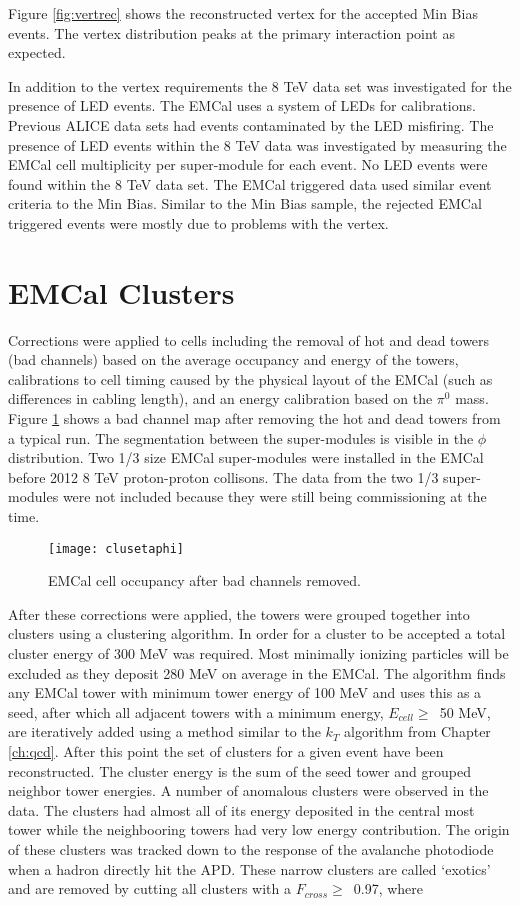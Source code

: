 Figure \ref{fig:vertrec} shows the reconstructed vertex for the accepted Min Bias events.  The vertex distribution peaks at the primary interaction point as expected. 

 In addition to the vertex requirements the 8 TeV data set was investigated for the presence of LED events.  The EMCal uses a system of LEDs for calibrations.  Previous ALICE data sets had events contaminated by the LED misfiring.  The presence of LED events within the 8 TeV data was investigated by measuring the EMCal cell multiplicity per super-module for each event.  No LED events were found within the 8 TeV data set.  The EMCal triggered data used similar event criteria to the Min Bias.  Similar to the Min Bias sample, the rejected EMCal triggered events were mostly due to problems with the vertex.


\section{EMCal Clusters}


Corrections were applied to cells including the removal of hot and dead towers (bad channels) based on the average occupancy and energy of the towers, calibrations to cell timing caused by the physical layout of the EMCal (such as differences in cabling length), and an energy calibration based on the $\pi^{0}$ mass.   Figure \ref{fig:badchannel} shows a bad channel map after removing the hot and dead towers from a typical run.  The segmentation between the super-modules is visible in the $\phi$ distribution.   Two 1/3 size EMCal super-modules were installed in the EMCal before 2012 8 TeV proton-proton collisons.  The data from the two 1/3 super-modules were not included because they were still being commissioning at the time.

\begin{figure}[h]
\texttt{[image: clusetaphi]}
\centering
\caption{EMCal cell occupancy after bad channels removed.}
\label{fig:badchannel}
\end{figure}

After these corrections were applied, the towers were grouped together into clusters using a clustering algorithm.  In order for a cluster to be accepted a total cluster energy of 300 MeV was required.  Most minimally ionizing particles will be excluded as they deposit 280 MeV on average in the EMCal.  The algorithm finds any EMCal tower with minimum tower energy of 100 MeV and uses this as a seed, after which all adjacent towers with a minimum energy, $E_{cell} \geq \,$ 50 MeV, are iteratively added using a method similar to the $k_{T}$ algorithm from Chapter \ref{ch:qcd}.  After this point the set of clusters for a given event have been reconstructed.  The cluster energy is the sum of the seed tower and grouped neighbor tower energies.  A number of anomalous clusters were observed in the data.  The clusters had almost all of its energy deposited in the central most tower while the neighbooring towers had very low energy contribution.  The origin of these clusters was tracked down to the response of the avalanche photodiode when a hadron directly hit the APD.  These narrow clusters are called `exotics' and are removed by cutting all clusters with a $F_{cross} \geq \,$ 0.97, where

